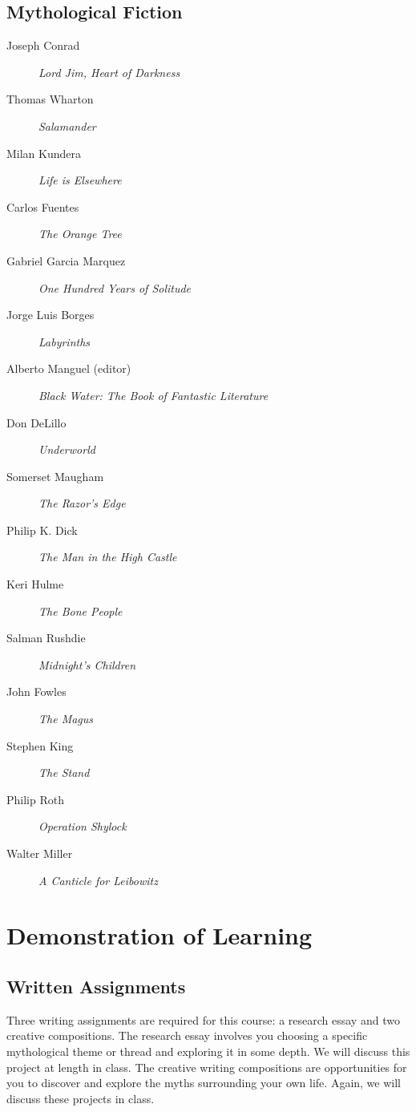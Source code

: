 \documentclass[10pt,DIV09,letterpaper,oneside,headsepline]{scrreprt}
\begin{document}
\begin{flushleft}
\subsection{Mythological Fiction}
\begin{description}
\item [Joseph Conrad] \textit{Lord Jim, Heart of Darkness\/}
\item [Thomas Wharton] \textit{Salamander\/}
\item [Milan Kundera] \textit{Life is Elsewhere\/}
\item [Carlos Fuentes] \textit{The Orange Tree\/}
\item [Gabriel Garcia Marquez] \textit{One Hundred Years of Solitude\/}
\item [Jorge Luis Borges] \textit{Labyrinths\/}
\item [Alberto Manguel (editor)] \textit{Black Water: The Book of
Fantastic Literature\/}
\item [Don DeLillo] \textit{Underworld\/}
\item [Somerset Maugham] \textit{The Razor's Edge\/}
\item [Philip K. Dick] \textit{The Man in the High Castle\/}
\item [Keri Hulme] \textit{The Bone People\/}
\item [Salman Rushdie] \textit{Midnight's Children\/}
\item [John Fowles] \textit{The Magus\/}
\item [Stephen King] \textit{The Stand\/}
\item [Philip Roth] \textit{Operation Shylock\/}
\item [Walter Miller] \textit{A Canticle for Leibowitz\/}
\end{description}
\end{flushleft}

\section{Demonstration of Learning}

\subsection{Written Assignments}
Three writing assignments are required for this course: a research
essay and two creative compositions. The research essay involves you
choosing a specific mythological theme or thread and exploring it in
some depth. We will discuss this project at length in class. The
creative writing compositions are opportunities for you to discover
and explore the myths surrounding your own life. Again, we will
discuss these projects in class.
\end{document}
